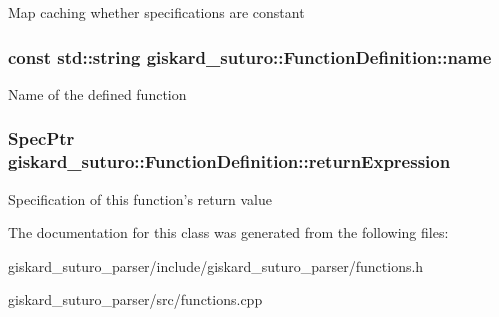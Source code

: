 Map caching whether specifications are constant \hypertarget{classgiskard__suturo_1_1FunctionDefinition_ab482fb6e6a9e27255e398c834d1bc813}{
\subsubsection[{name}]{\setlength{\rightskip}{0pt plus 5cm}const std\-::string giskard\-\_\-suturo\-::\-Function\-Definition\-::name}}\label{classgiskard__suturo_1_1FunctionDefinition_ab482fb6e6a9e27255e398c834d1bc813}
Name of the defined function \hypertarget{classgiskard__suturo_1_1FunctionDefinition_a17ab4ec5dce5ba78f94917d88b434c29}{
\subsubsection[{return\-Expression}]{\setlength{\rightskip}{0pt plus 5cm}Spec\-Ptr giskard\-\_\-suturo\-::\-Function\-Definition\-::return\-Expression\hspace{0.3cm}{\ttfamily [private]}}}\label{classgiskard__suturo_1_1FunctionDefinition_a17ab4ec5dce5ba78f94917d88b434c29}
Specification of this function's return value 

The documentation for this class was generated from the following files\-:\begin{DoxyCompactItemize}
\item 
giskard\-\_\-suturo\-\_\-parser/include/giskard\-\_\-suturo\-\_\-parser/functions.\-h\item 
giskard\-\_\-suturo\-\_\-parser/src/functions.\-cpp\end{DoxyCompactItemize}
